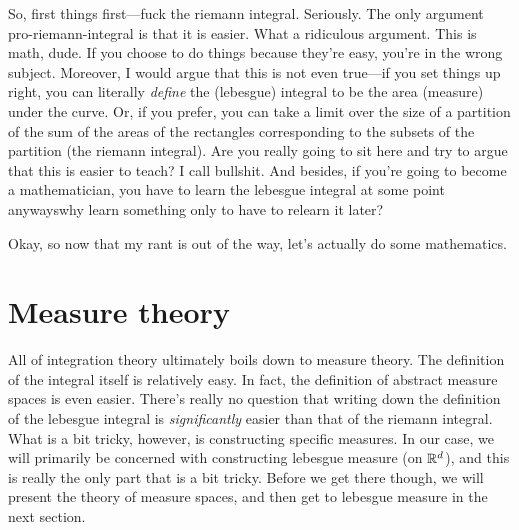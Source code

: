 So, first things first---fuck the riemann integral.  Seriously.  The only argument pro-riemann-integral is that it is easier.  What a ridiculous argument.  This is math, dude.  If you choose to do things because they're easy, you're in the wrong subject.  Moreover, I would argue that this is not even true---if you set things up right, you can literally \emph{define} the (lebesgue) integral to be the area (measure) under the curve.  Or, if you prefer, you can take a limit over the size of a partition of the sum of the areas of the rectangles corresponding to the subsets of the partition (the riemann integral).  Are you really going to sit here and try to argue that this is easier to teach?  I call bullshit.  And besides, if you're going to become a mathematician, you have to learn the lebesgue integral at some point anyways\textellipsis why learn something only to have to relearn it later?

Okay, so now that my rant is out of the way, let's actually do some mathematics.

\section{Measure theory}

All of integration theory ultimately boils down to measure theory.  The definition of the integral itself is relatively easy.  In fact, the definition of abstract measure spaces is even easier.  There's really no question that writing down the definition of the lebesgue integral is \emph{significantly} easier than that of the riemann integral.  What is a bit tricky, however, is constructing specific measures.  In our case, we will primarily be concerned with constructing lebesgue measure (on $\mathbb{R} ^d$), and this is really the only part that is a bit tricky.  Before we get there though, we will present the theory of measure spaces, and then get to lebesgue measure in the next section.

